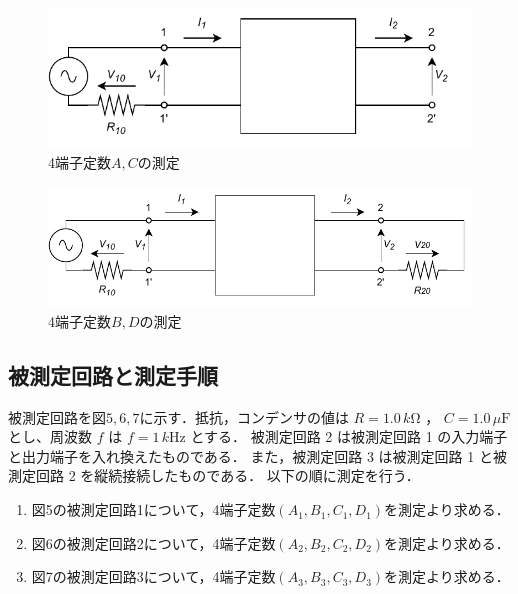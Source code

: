 \begin{figure}[H]
    \begin{center}
        \includegraphics[]{figure3.drawio.pdf}
        \caption{4端子定数$A,C$の測定}
    \end{center}
\end{figure}

\begin{figure}[H]
    \begin{center}
        \includegraphics[]{figure4.drawio.pdf}
        \caption{4端子定数$B,D$の測定}
    \end{center}
\end{figure}


\subsection{被測定回路と測定手順}
被測定回路を図$5,6,7$に示す．抵抗，コンデンサの値は $R=1.0\,\si{k\ohm}$ ， $C=1.0\,\si{\mu\farad}$ とし、周波数 $f$ は $f=1\,\si{k\hertz}$ とする．
被測定回路 2 は被測定回路 1 の入力端子と出力端子を入れ換えたものである．
また，被測定回路 3 は被測定回路 1 と被測定回路 2 を縦続接続したものである． 以下の順に測定を行う．

\begin{enumerate}
    \item 図5の被測定回路1について，4端子定数$(A_1, B_1, C_1, D_1)$を測定より求める．
    \item 図6の被測定回路2について，4端子定数$(A_2, B_2, C_2, D_2)$を測定より求める．
    \item 図7の被測定回路3について，4端子定数$(A_3, B_3, C_3, D_3)$を測定より求める．
\end{enumerate}

